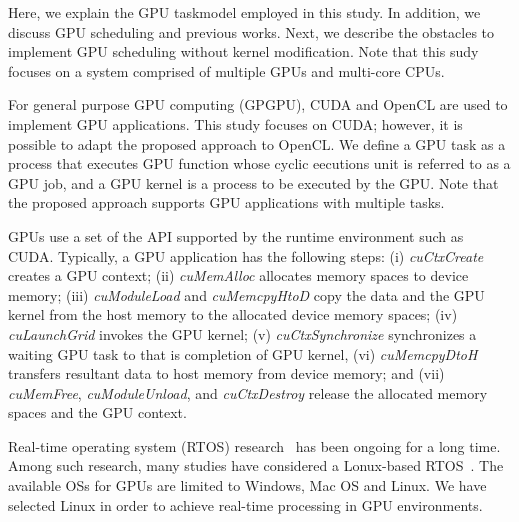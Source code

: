 \label{sec:system_model}
Here, we explain the GPU taskmodel employed in this study.
In addition, we discuss GPU scheduling and previous works.
Next, we describe the obstacles to implement GPU scheduling without kernel modification.
Note that this sudy focuses on a system comprised of multiple GPUs and multi-core CPUs.

For general purpose GPU computing (GPGPU), CUDA and OpenCL are used to implement GPU applications.
This study focuses on CUDA; however, it is possible to adapt the proposed approach to OpenCL.
We define a GPU task as a process that executes GPU function whose cyclic eecutions unit is referred to as a GPU job,
and a GPU kernel is a process to be executed by the GPU.
Note that the proposed approach supports GPU applications with multiple tasks.

GPUs use a set of the API supported by the runtime environment such as CUDA.
Typically, a GPU application has the following steps:
(i) \textit{cuCtxCreate} creates a GPU context;
(ii) \textit{cuMemAlloc} allocates memory spaces to device memory; 
(iii) \textit{cuModuleLoad} and \textit{cuMemcpyHtoD} copy the data and the GPU kernel from the host memory to the allocated device memory spaces;
(iv) \textit{cuLaunchGrid} invokes the GPU kernel;
(v) \textit{cuCtxSynchronize} synchronizes a waiting GPU task to that is completion of GPU kernel,
(vi) \textit{cuMemcpyDtoH} transfers resultant data to host memory from device memory; and
(vii) \textit{cuMemFree}, \textit{cuModuleUnload}, and \textit{cuCtxDestroy} release the allocated memory spaces and the GPU context.

Real-time operating system (RTOS) research~\cite{spring,redline,itron,rk} has been ongoing for a long time.
Among such research, many studies have considered a Lonux-based RTOS~\cite{litmus,prk,rtai,yodaiken1999rtlinux,kato2009loadable}.
The available OSs for GPUs are limited to Windows, Mac OS and Linux.
We have selected Linux in order to achieve real-time processing in GPU environments.

